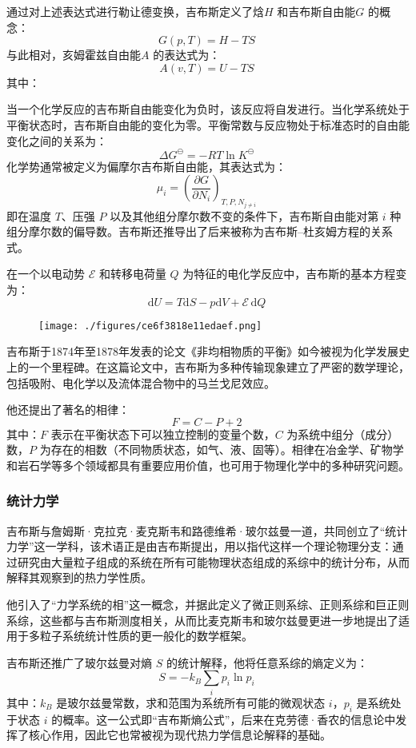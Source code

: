通过对上述表达式进行勒让德变换，吉布斯定义了焓$H$ 和吉布斯自由能$G$ 的概念：
$$
G(p, T) = H - T S~
$$
与此相对，亥姆霍兹自由能$A$ 的表达式为：
$$
A(v, T) = U - T S~
$$
其中：

当一个化学反应的吉布斯自由能变化为负时，该反应将自发进行。当化学系统处于平衡状态时，吉布斯自由能的变化为零。平衡常数与反应物处于标准态时的自由能变化之间的关系为：
$$
\Delta G^\ominus = -RT \ln K^\ominus~
$$
化学势通常被定义为偏摩尔吉布斯自由能，其表达式为：
$$
\mu_i = \left( \frac{\partial G}{\partial N_i} \right)_{T, P, N_{j \ne i}}~
$$
即在温度 $T$、压强 $P$ 以及其他组分摩尔数不变的条件下，吉布斯自由能对第 $i$ 种组分摩尔数的偏导数。吉布斯还推导出了后来被称为吉布斯–杜亥姆方程的关系式。

在一个以电动势 $\mathcal{E}$ 和转移电荷量 $Q$ 为特征的电化学反应中，吉布斯的基本方程变为：
$$
\mathrm{d}U = T\mathrm{d}S - p\mathrm{d}V + \mathcal{E}\,\mathrm{d}Q~
$$
\begin{figure}[ht]
\centering
\texttt{[image: ./figures/ce6f3818e11edaef.png]}
\caption{} \label{fig_QSY_7}
\end{figure}
吉布斯于1874年至1878年发表的论文《非均相物质的平衡》如今被视为化学发展史上的一个里程碑。在这篇论文中，吉布斯为多种传输现象建立了严密的数学理论，包括吸附、电化学以及流体混合物中的马兰戈尼效应。

他还提出了著名的相律：
$$
F = C - P + 2~
$$
其中：$F$ 表示在平衡状态下可以独立控制的变量个数，$C$ 为系统中组分（成分）数，$P$ 为存在的相数（不同物质状态，如气、液、固等）。相律在冶金学、矿物学和岩石学等多个领域都具有重要应用价值，也可用于物理化学中的多种研究问题。
\subsubsection{统计力学}
吉布斯与詹姆斯·克拉克·麦克斯韦和路德维希·玻尔兹曼一道，共同创立了“统计力学”这一学科，该术语正是由吉布斯提出，用以指代这样一个理论物理分支：通过研究由大量粒子组成的系统在所有可能物理状态组成的系综中的统计分布，从而解释其观察到的热力学性质。

他引入了“力学系统的相”这一概念，并据此定义了微正则系综、正则系综和巨正则系综，这些都与吉布斯测度相关，从而比麦克斯韦和玻尔兹曼更进一步地提出了适用于多粒子系统统计性质的更一般化的数学框架。

吉布斯还推广了玻尔兹曼对熵 $S$ 的统计解释，他将任意系综的熵定义为：
$$
S = -k_B \sum_i p_i \ln p_i~
$$
其中：$k_B$ 是玻尔兹曼常数，求和范围为系统所有可能的微观状态 $i$，$p_i$ 是系统处于状态 $i$ 的概率。这一公式即“吉布斯熵公式”，后来在克劳德·香农的信息论中发挥了核心作用，因此它也常被视为现代热力学信息论解释的基础。

